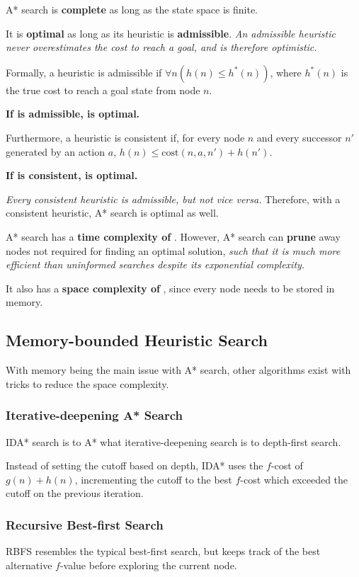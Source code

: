         A* search is \textbf{complete} as long as the state space is finite.

        It is \textbf{optimal} as long as its heuristic is \textbf{admissible}. \emph{An admissible heuristic never overestimates the cost to reach a goal, and is therefore optimistic.}

        Formally, a heuristic is admissible if $\forall n(h(n) \le h^*(n))$, where $h^*(n)$ is the true cost to reach a goal state from node $n$.

        \textbf{If  is admissible,  is optimal.}

        Furthermore, a heuristic is consistent if, for every node $n$ and every successor $n'$ generated by an action $a$, $h(n) \le \text{cost}(n, a, n') + h(n')$.

        \textbf{If  is consistent,  is optimal.}

        \emph{Every consistent heuristic is admissible, but not vice versa.} Therefore, with a consistent heuristic, A* search is optimal as well.

        A* search has a \textbf{time complexity of} . However, A* search can \textbf{prune} away nodes not required for finding an optimal solution, \emph{such that it is much more efficient than uninformed searches despite its exponential complexity}.

        It also has a \textbf{space complexity of} , since every node needs to be stored in memory.

    \subsection{Memory-bounded Heuristic Search}
        With memory being the main issue with A* search, other algorithms exist with tricks to reduce the space complexity.

        \subsubsection{Iterative-deepening A* Search}
        IDA* search is to A* what iterative-deepening search is to depth-first search.

        Instead of setting the cutoff based on depth, IDA* uses the $f$-cost of $g(n) + h(n)$, incrementing the cutoff to the best $f$-cost which exceeded the cutoff on the previous iteration.

        \subsubsection{Recursive Best-first Search}
        RBFS resembles the typical best-first search, but keeps track of the best alternative $f$-value before exploring the current node.

